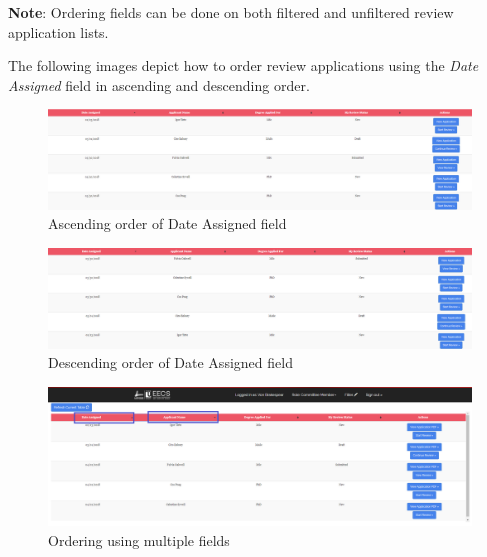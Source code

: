 \documentclass[fontsize=12pt,paper=letter,twoside]{scrartcl}
\begin{document}
\bigskip
\noindent \textbf{Note}: Ordering fields can be done on both filtered and unfiltered review application lists.

\bigskip
\noindent The following images depict how to order review applications using the \emph{Date Assigned} field in ascending and descending order.

\begin{figure}[!htb]
\begin{center}
\includegraphics[width=.99\textwidth]{images/cm/order_ascending.png}
\end{center}
\caption{Ascending order of Date Assigned field}
\label{fig:cm:order_ascending}
\end{figure}

\begin{figure}[!htb]
\begin{center}
\includegraphics[width=.99\textwidth]{images/cm/order_descending.png}
\end{center}
\caption{Descending order of Date Assigned field}
\label{fig:cm:order_descending}
\end{figure}

\newpage

\begin{figure}[!htb]
\begin{center}
\includegraphics[width=.99\textwidth]{images/cm/multiple_order.png}
\end{center}
\caption{Ordering using multiple fields}
\label{fig:cm:multiple_order}
\end{figure}
\end{document}
